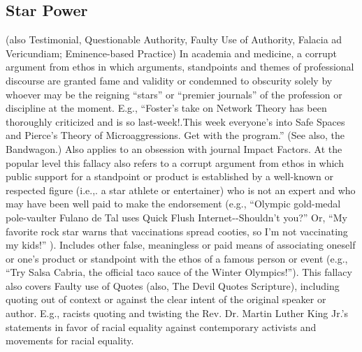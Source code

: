 \documentclass[10pt,a4paper,british]{article}
\begin{document}
\begin{multicols}{2}
	\subsection{Star Power} (also Testimonial, Questionable Authority, Faulty
	Use of Authority, Falacia ad Vericundiam; Eminence{-}based Practice) In
	academia and medicine, a corrupt argument from ethos in which arguments,
	standpoints and themes of professional discourse are granted fame and
	validity or condemned to obscurity solely by whoever may be the reigning
	``stars'' or ``premier journals'' of the profession or discipline at the
	moment. E.g., ``Foster's take on Network Theory has been thoroughly
	criticized and is so last{-}week!.This week everyone's into Safe Spaces and
	Pierce's Theory of Microaggressions. Get with the program.'' (See also, the
	Bandwagon.) Also applies to an obsession with journal Impact Factors. At
	the popular level this fallacy also refers to a corrupt argument from ethos
	in which public support for a standpoint or product is established by a
	well{-}known or respected figure (i.e.,. a star athlete or entertainer) who
	is not an expert and who may have been well paid to make the endorsement
	(e.g., ``Olympic gold{-}medal pole{-}vaulter Fulano de Tal uses Quick Flush
	Internet{-}{-}Shouldn’t you?'' Or, ``My favorite rock star warns that
	vaccinations spread cooties, so I'm not vaccinating my kids!'' ). Includes
	other false, meaningless or paid means of associating oneself or one’s
	product or standpoint with the ethos of a famous person or event (e.g.,
	“Try Salsa Cabria, the official taco sauce of the Winter Olympics!”). This
	fallacy also covers Faulty use of Quotes (also, The Devil Quotes
	Scripture), including quoting out of context or against the clear intent of
	the original speaker or author.  E.g., racists quoting and twisting the
	Rev. Dr. Martin Luther King Jr.'s statements in favor of racial equality
	against contemporary activists and movements for racial equality. 


\end{multicols}
\end{document}
